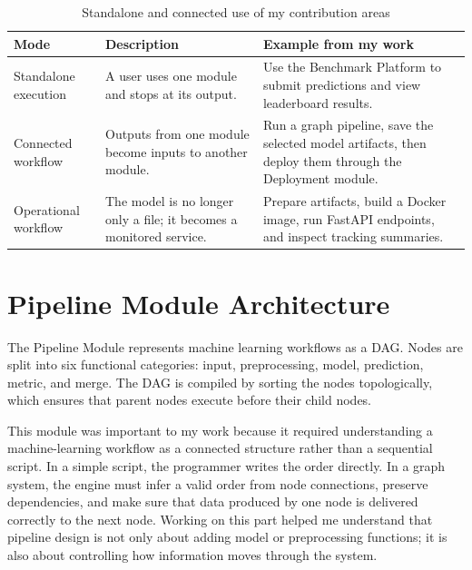 \documentclass[12pt,a4paper,oneside]{report}
\begin{document}
\begin{table}[H]
\centering
\small
\caption{Standalone and connected use of my contribution areas}
\label{tab:individual-standalone-e2e}
\begin{tabularx}{\textwidth}{p{}X X}
\toprule
\textbf{Mode} & \textbf{Description} & \textbf{Example from my work} \\
\midrule
Standalone execution &
A user uses one module and stops at its output. &
Use the Benchmark Platform to submit predictions and view leaderboard results. \\
\midrule
Connected workflow &
Outputs from one module become inputs to another module. &
Run a graph pipeline, save the selected model artifacts, then deploy them through the Deployment module. \\
\midrule
Operational workflow &
The model is no longer only a file; it becomes a monitored service. &
Prepare artifacts, build a Docker image, run FastAPI endpoints, and inspect tracking summaries. \\
\bottomrule
\end{tabularx}
\end{table}

\section{Pipeline Module Architecture}
The Pipeline Module represents machine learning workflows as a DAG. Nodes are split into six functional categories: input, preprocessing, model, prediction, metric, and merge. The DAG is compiled by sorting the nodes topologically, which ensures that parent nodes execute before their child nodes.

This module was important to my work because it required understanding a machine-learning workflow as a connected structure rather than a sequential script. In a simple script, the programmer writes the order directly. In a graph system, the engine must infer a valid order from node connections, preserve dependencies, and make sure that data produced by one node is delivered correctly to the next node. Working on this part helped me understand that pipeline design is not only about adding model or preprocessing functions; it is also about controlling how information moves through the system.
\end{document}
